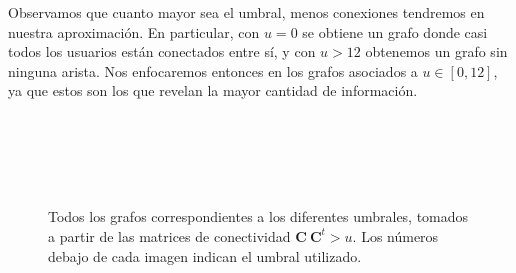 
\vspace{1em}
Observamos que cuanto mayor sea el umbral, menos conexiones tendremos en nuestra aproximación. En particular, con $u = 0$ se obtiene un grafo donde casi todos los usuarios están conectados entre sí, y con $u > 12$ obtenemos un grafo sin ninguna arista. Nos enfocaremos entonces en los grafos asociados a $u \in [0, 12]$, ya que estos son los que revelan la mayor cantidad de información. 

\vspace{1em}
\begin{figure}[!htbp]
    \centering
    \hfill
    \hfill
    \hfill
    \hfill
    \\[\smallskipamount]
    \hfill
    \hfill
    \hfill
    \hfill    
    \\[\smallskipamount]
    \hfill
    \hfill
    \hfill
    \hfill
    \\[\smallskipamount]
    \\[\smallskipamount]
    \caption{Todos los grafos correspondientes a los diferentes umbrales, tomados a partir de las matrices de conectividad $\mathbf{C}\ \mathbf{C}^t > u$. Los números debajo de cada imagen indican el umbral utilizado.} \label{grafos_aproximados}
\end{figure}




